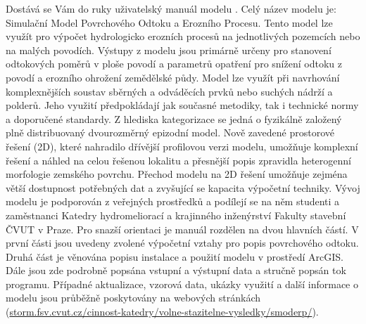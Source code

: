 Dostává se Vám do ruky uživatelský manuál modelu \smod. Celý název modelu je: Simulační Model Povrchového Odtoku a Erozního Procesu. Tento model lze využít pro výpočet hydrologicko erozních procesů na jednotlivých pozemcích nebo na malých povodích. Výstupy z modelu jsou primárně určeny pro stanovení odtokových poměrů v ploše povodí a parametrů opatření pro snížení odtoku z povodí a erozního ohrožení zemědělské půdy. Model lze využít při navrhování komplexnějších soustav sběrných a odváděcích prvků nebo suchých nádrží a polderů. Jeho využití předpokládají jak současné metodiky, tak i technické normy a doporučené standardy.
Z hlediska kategorizace se jedná o fyzikálně založený plně distribuovaný dvourozměrný epizodní model. 
% 
Nově zavedené prostorové řešení (2D), které nahradilo dřívější profilovou verzi modelu, umožňuje komplexní řešení a náhled na celou řešenou lokalitu a přesnější popis zpravidla heterogenní morfologie zemského povrchu. 
% 
Přechod modelu na 2D řešení umožňuje zejména větší dostupnost potřebných dat a zvyšující se kapacita výpočetní techniky. 
% 
% 
% 
Vývoj modelu je podporován z veřejných prostředků a podílejí se na něm studenti a zaměstnanci Katedry hydromeliorací a krajinného inženýrství Fakulty stavební ČVUT v Praze.
Pro snazší orientaci je manuál rozdělen na dvou hlavních částí. 
% 
V první části jsou uvedeny zvolené výpočetní vztahy pro popis povrchového odtoku. 
% 
Druhá část je věnována popisu instalace a použití modelu v prostředí ArcGIS. Dále jsou zde podrobně popsána vstupní a výstupní data a stručně popsán tok programu. 
Případné aktualizace, vzorová data, ukázky využití a další informace o modelu \smod jsou průběžně poskytovány na webových stránkách (\href{http://storm.fsv.cvut.cz/cinnost-katedry/volne-stazitelne-vysledky/smoderp/?lang=cz}{storm.fsv.cvut.cz/cinnost-katedry/volne-stazitelne-vysledky/smoderp/}).



